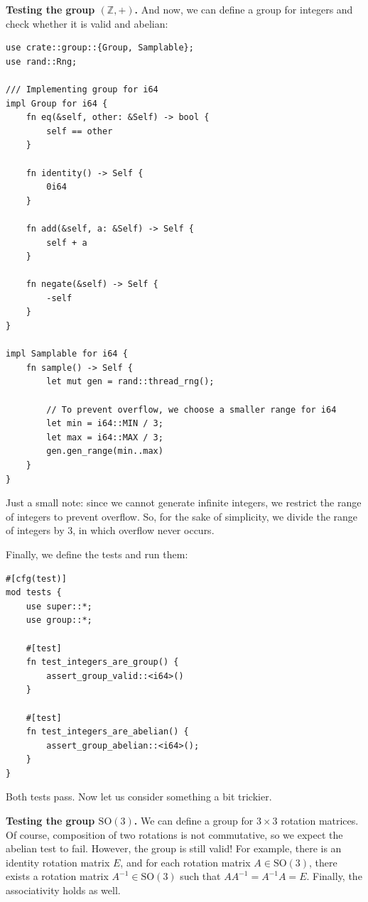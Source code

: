 \documentclass[../../book.tex]{subfiles}
\begin{document}
\textbf{Testing the group $(\mathbb{Z}, +)$.} And now, we can define a group for integers and check whether it is valid and abelian:
\begin{verbatim}
use crate::group::{Group, Samplable};
use rand::Rng;

/// Implementing group for i64
impl Group for i64 {
    fn eq(&self, other: &Self) -> bool {
        self == other
    }

    fn identity() -> Self {
        0i64
    }

    fn add(&self, a: &Self) -> Self {
        self + a
    }

    fn negate(&self) -> Self {
        -self
    }
}

impl Samplable for i64 {
    fn sample() -> Self {
        let mut gen = rand::thread_rng();

        // To prevent overflow, we choose a smaller range for i64
        let min = i64::MIN / 3; 
        let max = i64::MAX / 3;
        gen.gen_range(min..max)
    }
}
\end{verbatim}

Just a small note: since we cannot generate infinite integers, we restrict the range of integers to prevent overflow. So, 
for the sake of simplicity, we divide the range of integers by $3$, in which overflow never occurs.

Finally, we define the tests and run them:
\begin{verbatim}
#[cfg(test)]
mod tests {
    use super::*;
    use group::*;

    #[test]
    fn test_integers_are_group() {
        assert_group_valid::<i64>()
    }

    #[test]
    fn test_integers_are_abelian() {
        assert_group_abelian::<i64>();
    }
}
\end{verbatim}

Both tests pass. Now let us consider something a bit trickier.

\textbf{Testing the group $\text{SO}(3)$.} We can define a group for $3 \times 3$ rotation matrices. Of course, 
composition of two rotations is not commutative, so we expect the abelian test to fail. However, the group is still 
valid! For example, there is an identity rotation matrix $E$, and for each rotation matrix $A \in \text{SO}(3)$, 
there exists a rotation matrix $A^{-1} \in \text{SO}(3)$ such that $AA^{-1} = A^{-1}A = E$. Finally, the associativity 
holds as well.
\end{document}
